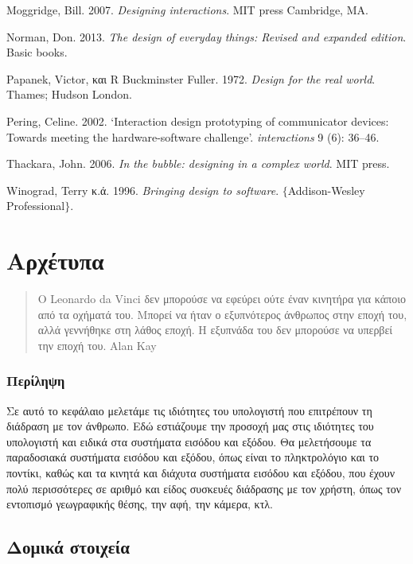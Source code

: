\documentclass[
]{article}
\begin{document}
Moggridge, Bill. 2007. \emph{Designing interactions}. MIT press
Cambridge, MA.

Norman, Don. 2013. \emph{The design of everyday things: Revised and
expanded edition}. Basic books.

Papanek, Victor, και R Buckminster Fuller. 1972. \emph{Design for the
real world}. Thames; Hudson London.

Pering, Celine. 2002. {`Interaction design prototyping of communicator
devices: Towards meeting the hardware-software challenge'}.
\emph{interactions} 9 (6): 36--46.

Thackara, John. 2006. \emph{In the bubble: designing in a complex
world}. MIT press.

Winograd, Terry κ.ά. 1996. \emph{Bringing design to software}.
\(\{\)Addison-Wesley Professional\(\}\).

\hypertarget{ux3b1ux3c1ux3c7ux3adux3c4ux3c5ux3c0ux3b1}{%
\section{Αρχέτυπα}\label{ux3b1ux3c1ux3c7ux3adux3c4ux3c5ux3c0ux3b1}}

\begin{quote}
O Leonardo da Vinci δεν μπορούσε να εφεύρει ούτε έναν κινητήρα για
κάποιο από τα οχήματά του. Μπορεί να ήταν ο εξυπνότερος άνθρωπος στην
εποχή του, αλλά γεννήθηκε στη λάθος εποχή. Η εξυπνάδα του δεν μπορούσε
να υπερβεί την εποχή του. Alan Kay
\end{quote}

\hypertarget{ux3c0ux3b5ux3c1ux3afux3bbux3b7ux3c8ux3b7}{%
\subsubsection{Περίληψη}\label{ux3c0ux3b5ux3c1ux3afux3bbux3b7ux3c8ux3b7}}

Σε αυτό το κεφάλαιο μελετάμε τις ιδιότητες του υπολογιστή που επιτρέπουν
τη διάδραση με τον άνθρωπο. Εδώ εστιάζουμε την προσοχή μας στις
ιδιότητες του υπολογιστή και ειδικά στα συστήματα εισόδου και εξόδου. Θα
μελετήσουμε τα παραδοσιακά συστήματα εισόδου και εξόδου, όπως είναι το
πληκτρολόγιο και το ποντίκι, καθώς και τα κινητά και διάχυτα συστήματα
εισόδου και εξόδου, που έχουν πολύ περισσότερες σε αριθμό και είδος
συσκευές διάδρασης με τον χρήστη, όπως τον εντοπισμό γεωγραφικής θέσης,
την αφή, την κάμερα, κτλ.

\hypertarget{ux3b4ux3bfux3bcux3b9ux3baux3ac-ux3c3ux3c4ux3bfux3b9ux3c7ux3b5ux3afux3b1}{%
\subsection{Δομικά
στοιχεία}\label{ux3b4ux3bfux3bcux3b9ux3baux3ac-ux3c3ux3c4ux3bfux3b9ux3c7ux3b5ux3afux3b1}}
\end{document}
